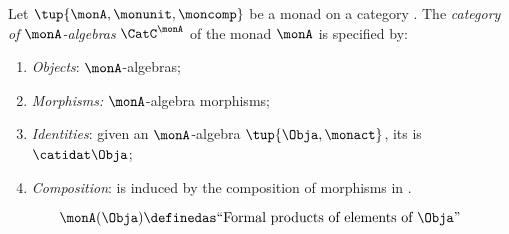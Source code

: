 \begin{ctdefinition}
    \label{def:catofmonadalgebras}
    Let $\tup{\monA, \monunit, \moncomp}$ be a monad on a category \CatC.
    The \emph{category of $\monA$-algebras} $\CatC^\monA$ of the monad $\monA$ is specified by:
    \begin{enumerate}
        \item \emph{Objects}: $\monA$-algebras;
        \item \emph{Morphisms:} $\monA$-algebra morphisms;
        \item \emph{Identities}: given an $\monA$-algebra $\tup{\Obja, \monact}$, its  is $\catidat\Obja$;
        \item \emph{Composition}: is induced by the composition of morphisms in \CatC.
    \end{enumerate}
\end{ctdefinition}







\TriangleDiagramMorphism{\Obja}{\monunit_\Obja}{\monA(\Obja)}{\monact}{\Obja}{\catid}

\begin{equation}\label{eq:MX-is-formal-product}
    \monA(\Obja) \definedas \text{``Formal products of elements of $\Obja$''}
\end{equation}

